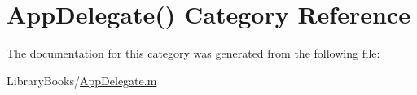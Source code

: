 \hypertarget{category_app_delegate_07_08}{}\section{App\+Delegate() Category Reference}
\label{category_app_delegate_07_08}


The documentation for this category was generated from the following file\+:\begin{DoxyCompactItemize}
\item 
Library\+Books/\hyperlink{_app_delegate_8m}{App\+Delegate.\+m}\end{DoxyCompactItemize}

